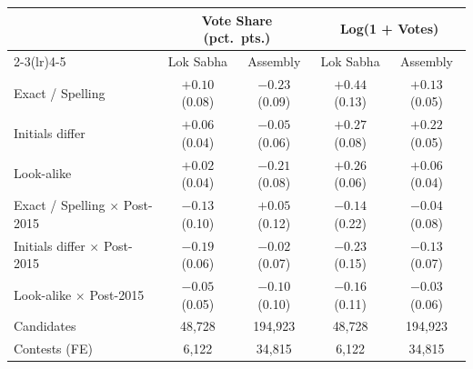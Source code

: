 \begin{tabular}{lcccc}
\toprule
 & \multicolumn{2}{c}{Vote Share (pct.\ pts.)} & \multicolumn{2}{c}{Log(1 + Votes)} \\
\cmidrule(lr){2-3}\cmidrule(lr){4-5}
 & Lok Sabha & Assembly & Lok Sabha & Assembly \\
\midrule
Exact / Spelling & $+0.10$ (0.08) & $-0.23$ (0.09) & $+0.44$ (0.13) & $+0.13$ (0.05) \\
Initials differ & $+0.06$ (0.04) & $-0.05$ (0.06) & $+0.27$ (0.08) & $+0.22$ (0.05) \\
Look-alike & $+0.02$ (0.04) & $-0.21$ (0.08) & $+0.26$ (0.06) & $+0.06$ (0.04) \\
Exact / Spelling $\times$ Post-2015 & $-0.13$ (0.10) & $+0.05$ (0.12) & $-0.14$ (0.22) & $-0.04$ (0.08) \\
Initials differ $\times$ Post-2015 & $-0.19$ (0.06) & $-0.02$ (0.07) & $-0.23$ (0.15) & $-0.13$ (0.07) \\
Look-alike $\times$ Post-2015 & $-0.05$ (0.05) & $-0.10$ (0.10) & $-0.16$ (0.11) & $-0.03$ (0.06) \\
\midrule
Candidates & 48,728 & 194,923 & 48,728 & 194,923 \\
Contests (FE) & 6,122 & 34,815 & 6,122 & 34,815 \\
\bottomrule
\end{tabular}
